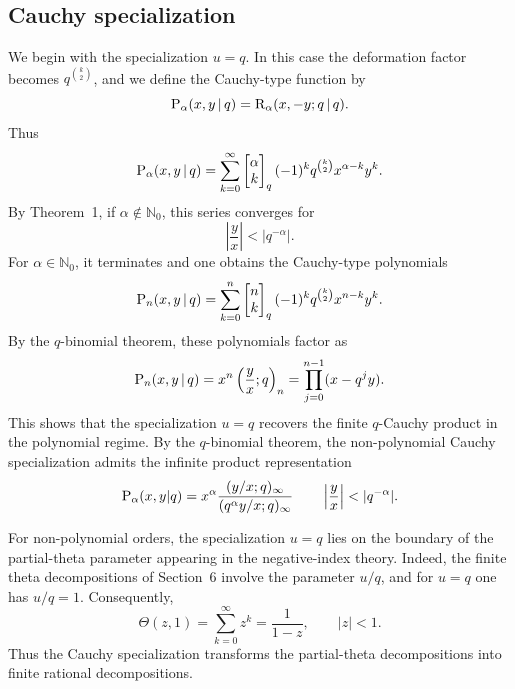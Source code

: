 \documentclass[12pt]{article}
\def\P{\mathop{\mbox{\textup{P}}}\nolimits}
\newcommand{\rr}{\mathrm{R}}
\begin{document}
\subsection{Cauchy specialization}

We begin with the specialization \(u=q\). In this case the deformation
factor becomes \(q^{\binom{k}{2}}\), and we define the Cauchy-type
function by
\[
\P_{\alpha}(x,y\,|\,q)
=
\rr_{\alpha}(x,-y;q\,|\,q).
\]
Thus
\begin{equation}\label{cauchy_alpha}
\P_{\alpha}(x,y\,|\,q)
=
\sum_{k=0}^{\infty}
\begin{bmatrix}
\alpha\\ k
\end{bmatrix}_{q}
(-1)^kq^{\binom{k}{2}}x^{\alpha-k}y^k.
\end{equation}
By Theorem~1, if \(\alpha\notin\mathbb N_0\), this series converges for \[ \left|\frac{y}{x}\right|<|q^{-\alpha}|. \] For \(\alpha\in\mathbb N_0\), it terminates and one obtains
the Cauchy-type polynomials
\[
\P_n(x,y\,|\,q)
=
\sum_{k=0}^{n}
\begin{bmatrix}
n\\ k
\end{bmatrix}_{q}
(-1)^kq^{\binom{k}{2}}x^{n-k}y^k.
\]
By the \(q\)-binomial theorem, these polynomials factor as
\[
\P_n(x,y\,|\,q)
=
x^n\left(\frac{y}{x};q\right)_n
=
\prod_{j=0}^{n-1}(x-q^j y).
\]
This shows that the specialization \(u=q\) recovers the finite
\(q\)-Cauchy product in the polynomial regime. By the \(q\)-binomial theorem, the non-polynomial Cauchy specialization admits the infinite product representation
\begin{equation}\label{eqn_fcauchy}
    \P_{\alpha}(x,y|q)=x^\alpha\frac{(y/x;q)_\infty}{(q^\alpha y/x;q)_\infty}\qquad \left|\frac{y}{x}\right|<|q^{-\alpha}|.
\end{equation}

For non-polynomial orders, the specialization $u=q$ lies on the boundary of the partial-theta parameter appearing in the negative-index theory. Indeed, the finite theta decompositions of Section~6 involve the parameter \(u/q\), and for \(u=q\) one has \(u/q=1\). Consequently,
\[
\Theta(z,1)
=
\sum_{k=0}^{\infty}z^k
=
\frac{1}{1-z},
\qquad |z|<1.
\]
Thus the Cauchy specialization transforms the partial-theta
decompositions into finite rational decompositions.
\end{document}

